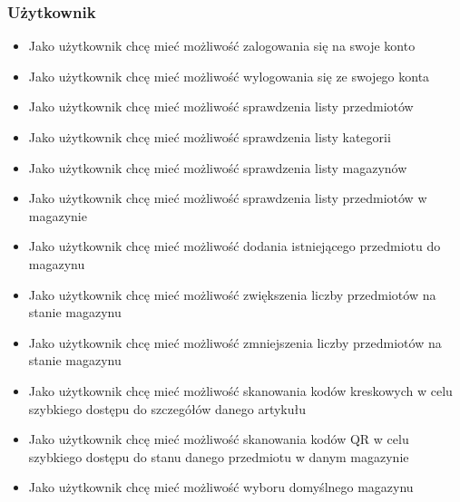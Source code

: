 \documentclass[../main.tex]{subfiles}
\begin{document}
        \subsubsection*{Użytkownik}
            \begin{itemize}
                \item Jako użytkownik chcę mieć możliwość zalogowania się na swoje konto
                \item Jako użytkownik chcę mieć możliwość wylogowania się ze swojego konta
                \item Jako użytkownik chcę mieć możliwość sprawdzenia listy przedmiotów
                \item Jako użytkownik chcę mieć możliwość sprawdzenia listy kategorii
                \item Jako użytkownik chcę mieć możliwość sprawdzenia listy magazynów
                \item Jako użytkownik chcę mieć możliwość sprawdzenia listy przedmiotów w magazynie
                \item Jako użytkownik chcę mieć możliwość dodania istniejącego przedmiotu do magazynu
                \item Jako użytkownik chcę mieć możliwość zwiększenia liczby przedmiotów na stanie magazynu
                \item Jako użytkownik chcę mieć możliwość zmniejszenia liczby przedmiotów na stanie magazynu
                \item Jako użytkownik chcę mieć możliwość skanowania kodów kreskowych w celu szybkiego dostępu do szczegółów danego artykułu
                \item Jako użytkownik chcę mieć możliwość skanowania kodów QR w celu szybkiego dostępu do stanu danego przedmiotu w danym magazynie
                \item Jako użytkownik chcę mieć możliwość wyboru domyślnego magazynu
            \end{itemize}
\end{document}
